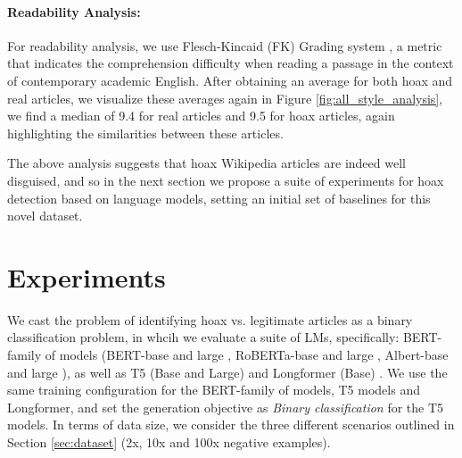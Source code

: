 \noindent\paragraph{\textbf{Readability Analysis:}}   For readability analysis, we use Flesch-Kincaid (FK) Grading system \citep{flesch2007flesch}, a metric that indicates the comprehension difficulty when reading a passage in the context of contemporary academic English.  After obtaining an average for both hoax and real articles, we visualize these averages again in Figure \ref{fig:all_style_analysis}, we find a median of 9.4 for real articles and 9.5 for hoax articles, again highlighting the similarities between these articles.

    






        

The above analysis suggests that hoax Wikipedia articles are indeed well disguised, and so in the next section we propose a suite of experiments for hoax detection based on language models, setting an initial set of baselines for this novel dataset.

\section{Experiments}
\label{expt}
We cast the problem of identifying hoax vs. legitimate articles as a binary classification problem, in whcih we evaluate a suite of LMs, specifically: BERT-family of models (BERT-base and large \cite{devlin2019bert}, RoBERTa-base and large \cite{liu2019roberta}, Albert-base and large \cite{lan2019albert}), as well as T5 (Base and Large) \cite{raffel2020exploring} and Longformer (Base) \cite{beltagy2020longformer}. We use the same training configuration for the BERT-family of models, T5 models and Longformer, and set the generation objective as \emph{Binary classification} for the T5 models. In terms of data size, we consider the three different scenarios outlined in Section \ref{sec:dataset} (2x, 10x and 100x negative examples). 


